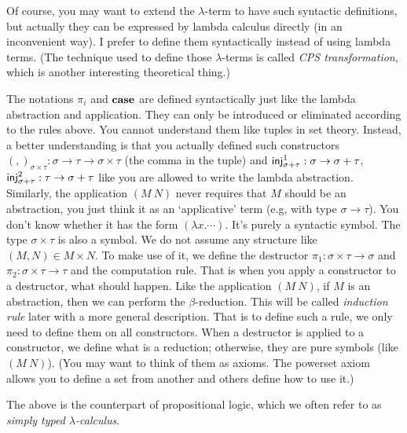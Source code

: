 Of course, you may want to extend the $\lambda$-term to have such
syntactic definitions, but actually they can be expressed by lambda
calculus directly \cite{Curry-Howard} (in an inconvenient way). 
I prefer to define them syntactically instead of using lambda terms.
(The technique used to define those $\lambda$-terms is called {\it CPS 
transformation}, which is another interesting theoretical thing.)

\begin{caveat}
    \label{constructor-destructor}
    The notations $\pi_i$ and $\text{\bf case}$ are defined syntactically
    just like the lambda abstraction and application. They can only be
    introduced or eliminated according to the rules above. You cannot
    understand them like tuples in set theory. Instead, a better
    understanding is that you actually defined such constructors 
    $(,)_{\sigma\times\tau}: \sigma\to\tau\to\sigma\times\tau$ (the comma
    in the tuple) and $\text{\sf inj}^1_{\sigma+\tau}: \sigma\to\sigma+\tau$, 
    $\text{\sf inj}^2_{\sigma+\tau}: \tau\to\sigma+\tau$ like you are allowed
    to write the lambda abstraction. Similarly, the application $(M\ N)$
    never requires that $M$ should be an abstraction, you just think it 
    as an `applicative' term (e.g, with type $\sigma\to\tau$). You don't 
    know whether it has the form $(\lambda x.\cdots)$. It's purely a
    syntactic symbol. The type $\sigma\times\tau$ is also a symbol. We
    do not assume any structure like $(M, N)\in M\times N$. To make
    use of it, we define the destructor $\pi_1:\sigma\times\tau\to\sigma$
    and $\pi_2:\sigma\times\tau\to\tau$ and the computation rule. That is
    when you apply a constructor to a destructor, what should happen.
    Like the application $(M\ N)$, if $M$ is an abstraction, then we can 
    perform the $\beta$-reduction. This will be called {\it induction 
    rule} later with a more general description. That is to define
    such a rule, we only need to define them on all constructors.
    When a destructor is applied to a constructor, we define what is a
    reduction; otherwise, they are pure symbols (like $(M\ N)$).
    (You may want to think of them as axioms. The powerset axiom allows 
    you to define a set from another and others define how to use it.)
\end{caveat}

The above is the counterpart of propositional logic, which we often
refer to as {\it simply typed $\lambda$-calculus}. 


